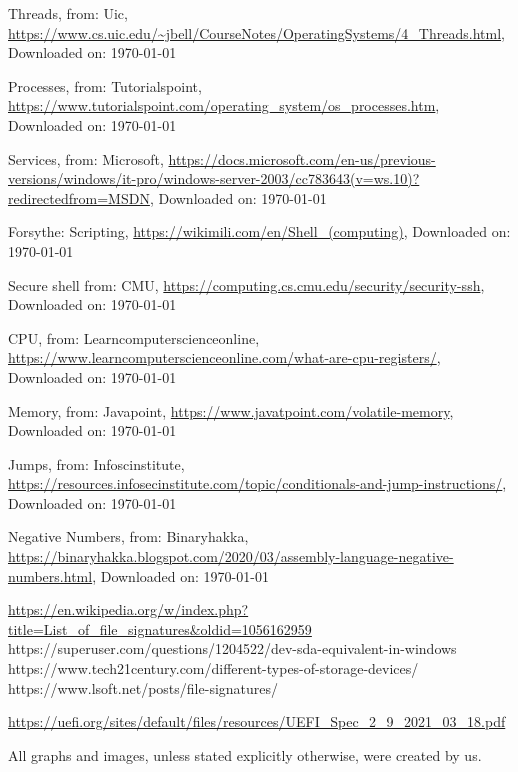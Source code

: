 \begin{thebibliography}{10}
	Threads, from: Uic,
	\url{https://www.cs.uic.edu/~jbell/CourseNotes/OperatingSystems/4_Threads.html},
	Downloaded on: \today

	Processes, from: Tutorialspoint,
	\url{https://www.tutorialspoint.com/operating_system/os_processes.htm},
	Downloaded on: \today

	Services, from: Microsoft,
	\url{https://docs.microsoft.com/en-us/previous-versions/windows/it-pro/windows-server-2003/cc783643(v=ws.10)?redirectedfrom=MSDN},
	Downloaded on: \today

	Forsythe: Scripting,
	\url{https://wikimili.com/en/Shell_(computing)},
	Downloaded on: \today

	Secure shell from: CMU,
	\url{https://computing.cs.cmu.edu/security/security-ssh},
	Downloaded on: \today

	CPU, from: Learncomputerscienceonline,
	\url{https://www.learncomputerscienceonline.com/what-are-cpu-registers/},
	Downloaded on: \today

	Memory, from: Javapoint,
	\url{https://www.javatpoint.com/volatile-memory},
	Downloaded on: \today

	Jumps, from: Infoscinstitute,
	\url{https://resources.infosecinstitute.com/topic/conditionals-and-jump-instructions/},
	Downloaded on: \today

	Negative Numbers, from: Binaryhakka,
	\url{https://binaryhakka.blogspot.com/2020/03/assembly-language-negative-numbers.html},
	Downloaded on: \today

\end{thebibliography}


\url{https://en.wikipedia.org/w/index.php?title=List\_of\_file\_signatures&oldid=1056162959}
https://superuser.com/questions/1204522/dev-sda-equivalent-in-windows
https://www.tech21century.com/different-types-of-storage-devices/
https://www.lsoft.net/posts/file-signatures/

\url{https://uefi.org/sites/default/files/resources/UEFI\_Spec\_2\_9\_2021\_03\_18.pdf}

%
All graphs and images, unless stated explicitly otherwise, were created by us. 

